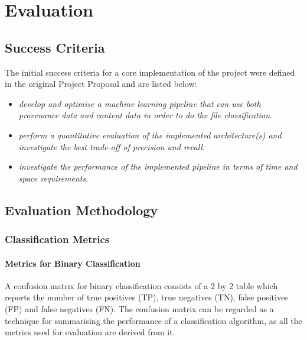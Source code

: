 

    \chapter{Evaluation}
    
    \section{Success Criteria}
    
    The initial success criteria for a core implementation of the project were defined in the original Project Proposal and are listed below: \\
    
    \begin{itemize}
        \item \textit{develop and optimise a machine learning pipeline that can use both provenance data and content data in order to do the file classification}. \\
        
        \item \textit{perform a quantitative evaluation of the implemented architecture(s) and investigate the best trade-off of precision and recall}. \\ 
        
        \item \textit{investigate the performance of the implemented pipeline in terms of time and space requirements}. \\
        
    \end{itemize}
    
    
    \section{Evaluation Methodology}
    
    \subsection{Classification Metrics}
    
    \subsubsection*{Metrics for Binary Classification}
    
    A confusion matrix for binary classification consists of a 2 by 2 table which reports the number of true positives (TP), true negatives (TN), false positives (FP) and false negatives (FN). The confusion matrix can be regarded as a technique for summarising the performance of a classification algorithm, as all the metrics used for evaluation are derived from it. 
    
